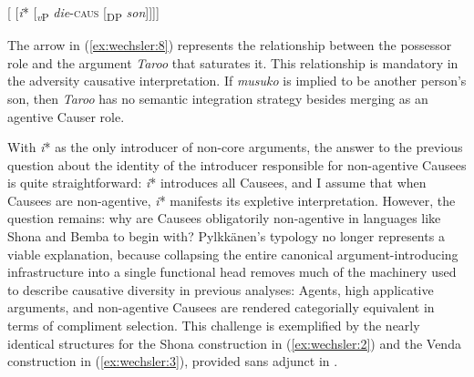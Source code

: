 \documentclass[output=paper,modfonts,nonflat,colorlinks,citecolor=brown]{langsci/langscibook}
\begin{document}
\newpage

\ea\label{ex:wechsler:8}
{[\textit{} [\textit{i}* [\textsubscript{\textit{v}P} \textit{die}-\textsc{caus} [\textsubscript{DP} \textsc{} \textit{son}]]]]} \\

\z
{}



The arrow in (\ref{ex:wechsler:8}) represents the relationship between the possessor role and the argument \textit{Taroo} that saturates it. This relationship is mandatory in the adversity causative interpretation. If \textit{musuko} is implied to be another person’s son, then \textit{Taroo} has no semantic integration strategy besides merging as an agentive Causer role.

With \textit{i}* as the only introducer of non-core arguments, the answer to the previous question about the identity of the introducer responsible for non-agentive Causees is quite straightforward: \textit{i}* introduces all Causees, and I assume that when Causees are non-agentive, \textit{i}* manifests its expletive interpretation. However, the question remains: why are Causees obligatorily non-agentive in languages like Shona and Bemba to begin with? Pylkkänen’s typology no longer represents a viable explanation, because collapsing the entire canonical argument-introducing infrastructure into a single functional head removes much of the machinery used to describe causative diversity in previous analyses: Agents, high applicative arguments, and non-agentive Causees are rendered categorially equivalent in terms of compliment selection. This challenge is exemplified by the nearly identical structures for the Shona construction in (\ref{ex:wechsler:2}) and the Venda construction in (\ref{ex:wechsler:3}), provided sans adjunct in .
\end{document}
